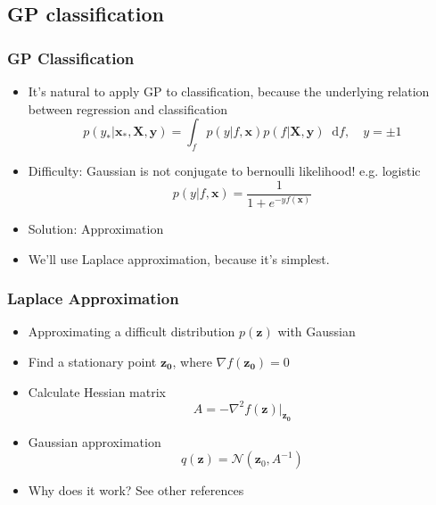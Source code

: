 \documentclass{beamer}
\newcommand*\diff{\mathop{}\!\mathrm{d}}
\begin{document}
\subsection{GP classification}
\begin{frame}
	\frametitle{GP Classification}
	\begin{itemize}
		\item {It's natural to apply GP to classification, because the underlying relation between regression and classification}
		\[ p(y_*|\bm{x}_*, \bm{X}, \bm{y})=\int_f p(y|f,\bm{x})p(f|\bm{X}, \bm{y})\diff f, \quad y=\pm 1 \]
		\item Difficulty: Gaussian is not conjugate to bernoulli likelihood! e.g. logistic
		\[
			p(y|f, \bm{x}) = \frac{1}{1+e^{-yf(\bm{x})}}
		\]
		\item Solution: Approximation
		\item We'll use Laplace approximation, because it's simplest.
	\end{itemize}	
\end{frame}

\begin{frame}
	\frametitle{Laplace Approximation}
	\begin{itemize}
		\item Approximating a difficult distribution $p(\bm{z})$ with Gaussian		
		\item Find a stationary point $\bm{z_0}$, where $\nabla f(\bm{z_0}) = 0$
		\item Calculate Hessian matrix
		\[
			A = -\nabla^2 f(\bm{z})|_{\bm{z_0}}
		\]
		\item Gaussian approximation
		\[
			q(\bm{z}) = \mathcal{N}(\bm{z}_0, A^{-1})
		\]
		\item Why does it work? See other references			
	\end{itemize}
\end{frame}
\end{document}
